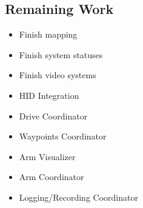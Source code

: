 \subsection{Remaining Work}
\begin{itemize}
\item Finish mapping
\item Finish system statuses
\item Finish video systems
\item HID Integration
\item Drive Coordinator
\item Waypoints Coordinator
\item Arm Visualizer
\item Arm Coordinator
\item Logging/Recording Coordinator
\end{itemize}